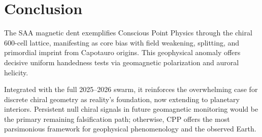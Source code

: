 \documentclass[11pt]{article}
\begin{document}
\section{Conclusion}
The SAA magnetic dent exemplifies Conscious Point Physics through the chiral 600-cell lattice, manifesting as core bias with field weakening, splitting, and primordial imprint from Capotauro origins. This geophysical anomaly offers decisive uniform handedness tests via geomagnetic polarization and auroral helicity.  

Integrated with the full 2025--2026 swarm, it reinforces the overwhelming case for discrete chiral geometry as reality's foundation, now extending to planetary interiors. Persistent null chiral signals in future geomagnetic monitoring would be the primary remaining falsification path; otherwise, CPP offers the most parsimonious framework for geophysical phenomenology and the observed Earth.
\end{document}
